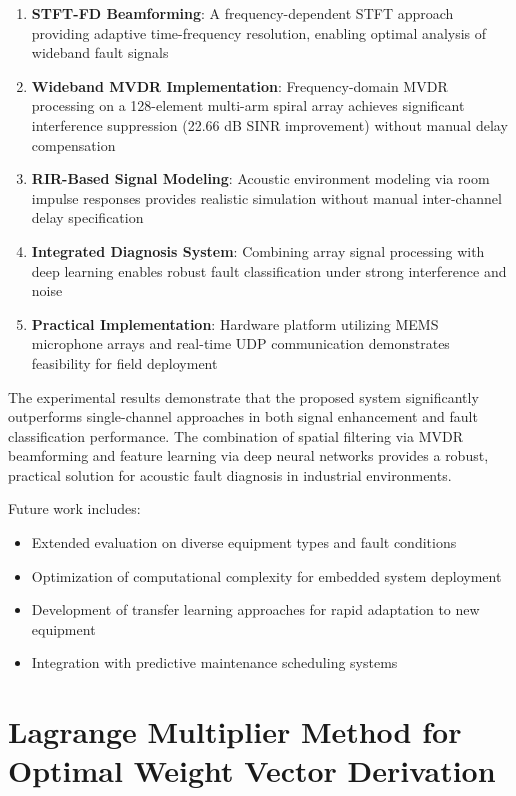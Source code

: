\documentclass[journal]{IEEEtran}
\begin{document}
\begin{enumerate}
    \item \textbf{STFT-FD Beamforming}: A frequency-dependent STFT approach providing adaptive time-frequency resolution, enabling optimal analysis of wideband fault signals
    
    \item \textbf{Wideband MVDR Implementation}: Frequency-domain MVDR processing on a 128-element multi-arm spiral array achieves significant interference suppression (22.66 dB SINR improvement) without manual delay compensation
    
    \item \textbf{RIR-Based Signal Modeling}: Acoustic environment modeling via room impulse responses provides realistic simulation without manual inter-channel delay specification
    
    \item \textbf{Integrated Diagnosis System}: Combining array signal processing with deep learning enables robust fault classification under strong interference and noise
    
    \item \textbf{Practical Implementation}: Hardware platform utilizing MEMS microphone arrays and real-time UDP communication demonstrates feasibility for field deployment
\end{enumerate}

The experimental results demonstrate that the proposed system significantly outperforms single-channel approaches in both signal enhancement and fault classification performance. The combination of spatial filtering via MVDR beamforming and feature learning via deep neural networks provides a robust, practical solution for acoustic fault diagnosis in industrial environments.

Future work includes:
\begin{itemize}
    \item Extended evaluation on diverse equipment types and fault conditions
    \item Optimization of computational complexity for embedded system deployment
    \item Development of transfer learning approaches for rapid adaptation to new equipment
    \item Integration with predictive maintenance scheduling systems
\end{itemize}

\appendix

\section{Lagrange Multiplier Method for Optimal Weight Vector Derivation}
\end{document}
